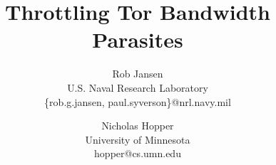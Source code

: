 \documentclass[twocolumn,10pt]{article}
\title{Throttling Tor Bandwidth Parasites}
\author{
{\rm Rob Jansen}\hspace{2.2cm}{\rm Paul Syverson}\\
U.S. Naval Research Laboratory\\
\{rob.g.jansen, paul.syverson\}@nrl.navy.mil
\and
{\rm Nicholas Hopper}\\
University of Minnesota\\
hopper@cs.umn.edu
}
\date{}
\begin{document}
\maketitle









\balance
{\footnotesize 


}
 
\nocite{*}

%
\end{document}
